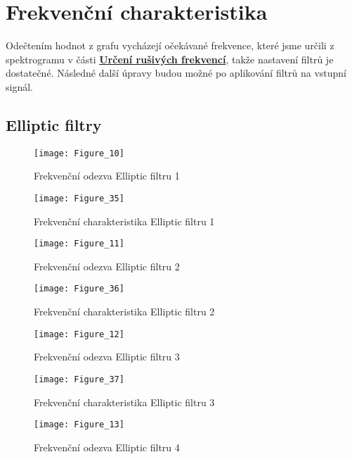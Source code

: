 \section{Frekvenční charakteristika}

Odečtením hodnot z grafu vycházejí očekávané frekvence, které jsme určili z spektrogramu v části \hyperref[sec:noise_freq]{\textbf{Určení rušivých frekvencí}}, takže nastavení filtrů je dostatečné.
Následné další úpravy budou možné po aplikování filtrů na vstupní signál.

\subsection{Elliptic filtry}
\begin{figure}[H] 
	\centering
	\texttt{[image: Figure\_10]}
	\caption{Frekvenční odezva Elliptic filtru 1}
\end{figure}

\begin{figure}[H] 
	\centering
	\texttt{[image: Figure\_35]}
	\caption{Frekvenční charakteristika Elliptic filtru 1}
\end{figure}

\begin{figure}[H] 
	\centering
	\texttt{[image: Figure\_11]}
	\caption{Frekvenční odezva Elliptic filtru 2}
\end{figure}

\begin{figure}[H] 
	\centering
	\texttt{[image: Figure\_36]}
	\caption{Frekvenční charakteristika Elliptic filtru 2}
\end{figure}

\begin{figure}[H] 
	\centering
	\texttt{[image: Figure\_12]}
	\caption{Frekvenční odezva Elliptic filtru 3}
\end{figure}

\begin{figure}[H] 
	\centering
	\texttt{[image: Figure\_37]}
	\caption{Frekvenční charakteristika Elliptic filtru 3}
\end{figure}

\begin{figure}[H] 
	\centering
	\texttt{[image: Figure\_13]}
	\caption{Frekvenční odezva Elliptic filtru 4}
\end{figure}


